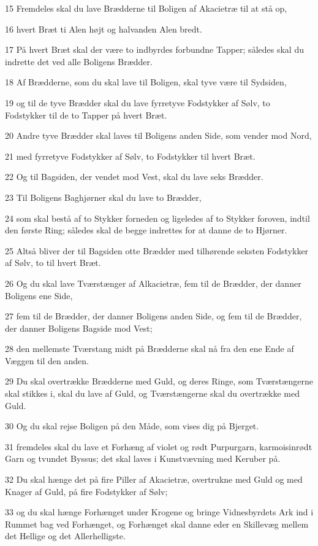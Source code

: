 \par 15 Fremdeles skal du lave Brædderne til Boligen af Akacietræ til at stå op,
\par 16 hvert Bræt ti Alen højt og halvanden Alen bredt.
\par 17 På hvert Bræt skal der være to indbyrdes forbundne Tapper; således skal du indrette det ved alle Boligens Brædder.
\par 18 Af Brædderne, som du skal lave til Boligen, skal tyve være til Sydsiden,
\par 19 og til de tyve Brædder skal du lave fyrretyve Fodstykker af Sølv, to Fodstykker til de to Tapper på hvert Bræt.
\par 20 Andre tyve Brædder skal laves til Boligens anden Side, som vender mod Nord,
\par 21 med fyrretyve Fodstykker af Sølv, to Fodstykker til hvert Bræt.
\par 22 Og til Bagsiden, der vendet mod Vest, skal du lave seks Brædder.
\par 23 Til Boligens Baghjørner skal du lave to Brædder,
\par 24 som skal bestå af to Stykker forneden og ligeledes af to Stykker foroven, indtil den første Ring; således skal de begge indrettes for at danne de to Hjørner.
\par 25 Altså bliver der til Bagsiden otte Brædder med tilhørende seksten Fodstykker af Sølv, to til hvert Bræt.
\par 26 Og du skal lave Tværstænger af Alkacietræ, fem til de Brædder, der danner Boligens ene Side,
\par 27 fem til de Brædder, der danner Boligens anden Side, og fem til de Brædder, der danner Boligens Bagside mod Vest;
\par 28 den mellemste Tværstang midt på Brædderne skal nå fra den ene Ende af Væggen til den anden.
\par 29 Du skal overtrække Brædderne med Guld, og deres Ringe, som Tværstængerne skal stikkes i, skal du lave af Guld, og Tværstængerne skal du overtrække med Guld.
\par 30 Og du skal rejse Boligen på den Måde, som vises dig på Bjerget.
\par 31 fremdeles skal du lave et Forhæng af violet og rødt Purpurgarn, karmoisinrødt Garn og tvundet Byssus; det skal laves i Kunstvævning med Keruber på.
\par 32 Du skal hænge det på fire Piller af Akacietræ, overtrukne med Guld og med Knager af Guld, på fire Fodstykker af Sølv;
\par 33 og du skal hænge Forhænget under Krogene og bringe Vidnesbyrdets Ark ind i Rummet bag ved Forhænget, og Forhænget skal danne eder en Skillevæg mellem det Hellige og det Allerhelligste.
